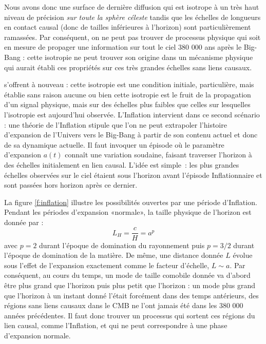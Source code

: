 Nous avons donc une surface de dernière diffusion qui est isotrope à un très haut niveau de précision \textit{sur toute la sphère céleste} tandis que les échelles de longueurs en contact causal (donc de tailles inférieures à l'horizon) sont particulièrement ramassées. Par conséquent, on ne peut pas trouver de processus physique qui soit en mesure de propager une information sur tout le ciel 380 000 ans après le Big-Bang : cette isotropie ne peut trouver son origine dans un mécanisme physique qui aurait établi ces propriétés sur ces très grandes échelles sans liens causaux.

 s'offrent à nouveau : cette isotropie est une condition initiale, particulière, mais établie sans raison aucune ou bien cette isotropie est le fruit de la propagation d'un signal physique, mais sur des échelles plus faibles que celles sur lesquelles l'isotropie est aujourd'hui observée. L'Inflation intervient dans ce second scénario : une théorie de l'Inflation stipule que l'on ne peut extrapoler l'histoire d'expansion de l'Univers vers le Big-Bang à partir de son contenu actuel et donc de sa dynamique actuelle. Il faut invoquer un épisode où le paramètre d'expansion $a(t)$ connaît une variation soudaine, faisant traverser l'horizon à des échelles initialement en lien causal. L'idée est simple~: les plus grandes échelles observées sur le ciel étaient sous l'horizon avant l'épisode Inflationnaire et sont passées hors horizon après ce dernier. 

La figure \ref{f:inflation} illustre les possibilités ouvertes par une période d'Inflation. Pendant les périodes d'expansion «normale», la taille physique de l'horizon est donnée par :
\begin{equation}
L_H=\frac{c}{H}=a^p
\end{equation}
avec $p=2$ durant l'époque de domination du rayonnement puis $p=3/2$ durant l'époque de domination de la matière. De même, une distance donnée $L$ évolue sous l'effet de l'expansion exactement comme le facteur d'échelle, $L\sim a$. Par conséquent, au cours du temps, un mode de taille comobile donnée va d'abord être plus grand que l'horizon puis plus petit que l'horizon : un mode plus grand que l'horizon à un instant donné l'était forcément dans des temps antérieurs, des régions sans liens causaux dans le CMB ne l'ont jamais été dans les 380 000 années précédentes. Il faut donc trouver un processus qui sortent ces régions du lien causal, comme l'Inflation, et qui ne peut correspondre à une phase d'expansion normale.


